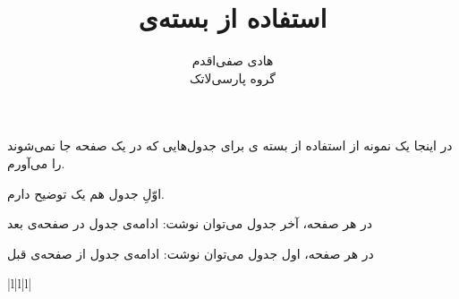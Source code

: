 \documentclass{article}
\begin{document}
\title{استفاده از بسته‌ی }
\author{هادی صفی‌اقدم
\\[3mm]
گروه پارسی‌لاتک
}
\maketitle
در اینجا یک نمونه از استفاده از بسته ی  برای جدول‌هایی که در یک صفحه جا نمی‌شوند را می‌آورم.

اوّلِ جدول هم یک توضیح  دارم.

در هر صفحه، آخر جدول می‌توان نوشت: ادامه‌ی جدول در صفحه‌ی بعد

در هر صفحه، اول جدول می‌توان نوشت: ادامه‌ی جدول از صفحه‌ی قبل

{\scriptsize 
\begin{longtable}{|l|l|l|}
\caption{اعدادی از ریاضی} 
\endfirsthead
{}%
{{\bfseries %
}} \\
\hline 
{}
 \\ \hline 
\endhead

\hline {} \\ \hline
\endfoot


\end{longtable}}
\end{document}
